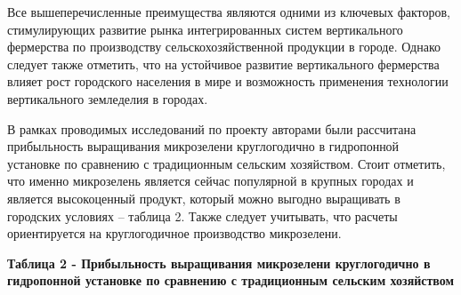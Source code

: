 Все вышеперечисленные преимущества являются одними из ключевых факторов,
стимулирующих развитие рынка интегрированных систем вертикального
фермерства по производству сельскохозяйственной продукции в городе.
Однако следует также отметить, что на устойчивое развитие вертикального
фермерства влияет рост городского населения в мире и возможность
применения технологии вертикального земледелия в городах.

В рамках проводимых исследований по проекту авторами были рассчитана
прибыльность выращивания микрозелени круглогодично в гидропонной
установке по сравнению с традиционным сельским хозяйством. Стоит
отметить, что именно микрозелень является сейчас популярной в крупных
городах и является высокоценный продукт, который можно выгодно
выращивать в городских условиях -- таблица 2. Также следует учитывать,
что расчеты ориентируется на круглогодичное производство микрозелени.

{\bfseries Таблица 2 - Прибыльность выращивания микрозелени круглогодично в
гидропонной установке по сравнению с традиционным сельским хозяйством}

